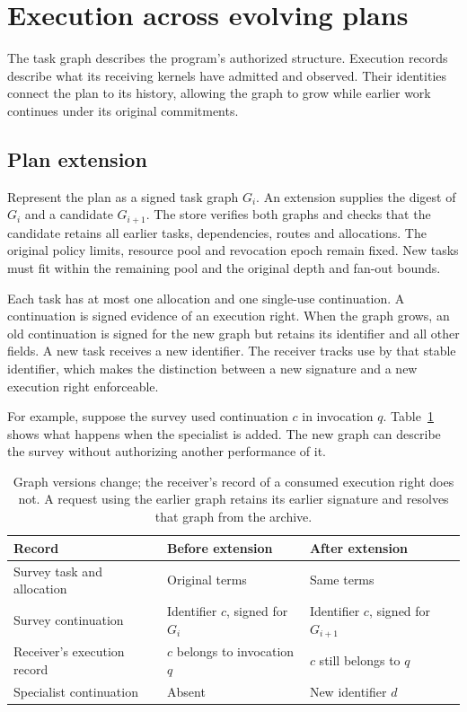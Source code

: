 \section{Execution across evolving plans}
\label{sec:execution}
The task graph describes the program's authorized structure. Execution records
describe what its receiving kernels have admitted and observed. Their identities
connect the plan to its history, allowing the graph to grow while earlier work
continues under its original commitments.

\subsection{Plan extension}
Represent the plan as a signed task graph $G_i$. An extension supplies the digest
of $G_i$ and a candidate $G_{i+1}$. The store verifies both graphs and checks
that the candidate retains all earlier tasks, dependencies, routes and
allocations. The original policy limits, resource pool and revocation epoch
remain fixed. New tasks must fit within the remaining pool and the original
depth and fan-out bounds.

Each task has at most one allocation and one single-use continuation. A
continuation is signed evidence of an execution right. When the graph grows,
an old continuation is signed for the new graph but retains its identifier and
all other fields. A new task receives a new identifier. The receiver tracks use
by that stable identifier, which makes the distinction between a new signature
and a new execution right enforceable.

For example, suppose the survey used continuation $c$ in invocation $q$.
Table~\ref{tab:extension} shows what happens when the specialist is added. The
new graph can describe the survey without authorizing another performance of it.

\begin{table}[ht]
\centering\small
\begin{tabularx}{\linewidth}{@{}l X X@{}}
\toprule
Record & Before extension & After extension\\
\midrule
Survey task and allocation & Original terms & Same terms\\
Survey continuation & Identifier $c$, signed for $G_i$ & Identifier $c$, signed for $G_{i+1}$\\
Receiver's execution record & $c$ belongs to invocation $q$ & $c$ still belongs to $q$\\
Specialist continuation & Absent & New identifier $d$\\
\bottomrule
\end{tabularx}
\caption{Graph versions change; the receiver's record of a consumed execution
right does not. A request using the earlier graph retains its earlier signature
and resolves that graph from the archive.}
\label{tab:extension}
\end{table}

